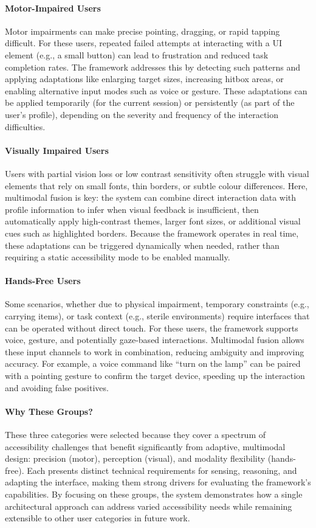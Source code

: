 \paragraph{Motor-Impaired Users}
Motor impairments can make precise pointing, dragging, or rapid tapping difficult. For these users, repeated failed attempts at interacting with a UI element (e.g., a small button) can lead to frustration and reduced task completion rates. The framework addresses this by detecting such patterns and applying adaptations like enlarging target sizes, increasing hitbox areas, or enabling alternative input modes such as voice or gesture. These adaptations can be applied temporarily (for the current session) or persistently (as part of the user’s profile), depending on the severity and frequency of the interaction difficulties.

\paragraph{Visually Impaired Users}
Users with partial vision loss or low contrast sensitivity often struggle with visual elements that rely on small fonts, thin borders, or subtle colour differences. Here, multimodal fusion is key: the system can combine direct interaction data with profile information to infer when visual feedback is insufficient, then automatically apply high-contrast themes, larger font sizes, or additional visual cues such as highlighted borders. Because the framework operates in real time, these adaptations can be triggered dynamically when needed, rather than requiring a static accessibility mode to be enabled manually.

\paragraph{Hands-Free Users}
Some scenarios, whether due to physical impairment, temporary constraints (e.g., carrying items), or task context (e.g., sterile environments) require interfaces that can be operated without direct touch. For these users, the framework supports voice, gesture, and potentially gaze-based interactions. Multimodal fusion allows these input channels to work in combination, reducing ambiguity and improving accuracy. For example, a voice command like “turn on the lamp” can be paired with a pointing gesture to confirm the target device, speeding up the interaction and avoiding false positives.
    
\paragraph{Why These Groups?}
These three categories were selected because they cover a spectrum of accessibility challenges that benefit significantly from adaptive, multimodal design: precision (motor), perception (visual), and modality flexibility (hands-free). Each presents distinct technical requirements for sensing, reasoning, and adapting the interface, making them strong drivers for evaluating the framework’s capabilities. By focusing on these groups, the system demonstrates how a single architectural approach can address varied accessibility needs while remaining extensible to other user categories in future work.

